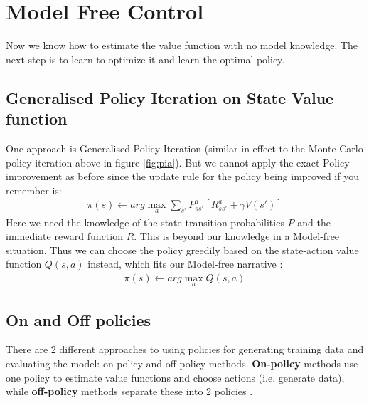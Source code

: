 \section{Model Free Control }
Now we know how to estimate the value function with no model knowledge. The next step is to learn to optimize it and learn the optimal policy. 


\subsection{Generalised Policy Iteration on State Value function} 
One approach is Generalised Policy Iteration (similar in effect to the Monte-Carlo policy iteration above in figure \ref{fig:pia}). But we cannot apply the exact Policy improvement as before since the update rule for the policy being improved if you remember is: 
\begin{align}
    \pi(s) \leftarrow arg \max_{a} \sum_{s'} P^{a}_{ss'} [R^{a}_{ss'} + \gamma V(s')]
\end{align}
Here we need the knowledge of the state transition probabilities $P$ and the immediate reward function $R$. This is beyond our knowledge in a Model-free situation. Thus we can choose the policy greedily based on the state-action value function $Q(s, a)$ instead, which fits our Model-free narrative \cite{lecture_mfc}:  
\begin{align}
    \pi(s) \leftarrow arg \max_{a} Q(s, a) 
\end{align}

\subsection{On and Off policies}
There are 2 different approaches to using policies for 
generating training data and evaluating the model: on-policy and
off-policy methods.
\textbf{On-policy} methods use one policy to estimate value functions and choose actions (i.e. generate data), while \textbf{off-policy} methods separate these into 2 policies \cite{lecture_mfc}. 

